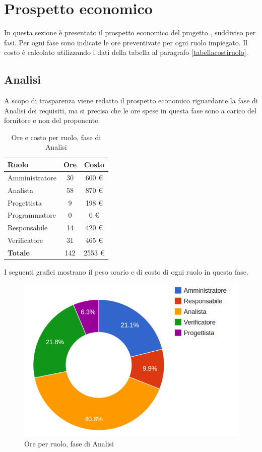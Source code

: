 \section{Prospetto economico}

In questa sezione è presentato il prospetto economico del progetto \ProjectName, suddiviso per fasi. Per ogni fase sono indicate le ore preventivate per ogni ruolo impiegato.
Il costo è calcolato utilizzando i dati della tabella al paragrafo \ref{tabellacostiruolo}.

\subsection{Analisi}

A scopo di trasparenza viene redatto il prospetto economico riguardante la fase di Analisi dei requisiti, ma si precisa che le ore spese in questa fase sono a carico del fornitore e non del proponente.

\begin{table}[H]
	\centering
	\begin{tabular}{ l c c }
	\textbf{Ruolo} & \textbf{Ore} & \textbf{Costo} \\
	\hline
	Amministratore & 30 & 600 €\\
	Analista & 58 & 870 €\\
	Progettista & 9 & 198 €\\
	Programmatore & 0 & 0 €\\
	Responsabile & 14 & 420 €\\
	Verificatore & 31 & 465 €\\
	\hline
	\textbf{Totale} & 142 & 2553 €\\
	\hline
	\end{tabular}
	\caption{Ore e costo per ruolo, fase di Analisi}
	\end{table}

I seguenti grafici mostrano il peso orario e di costo di ogni ruolo in questa fase.

\begin{figure}[H]
\centering
\includegraphics[scale=0.35]{5-1-1.png}
\caption{Ore per ruolo, fase di Analisi\label{fig:nome}}
\end{figure}


